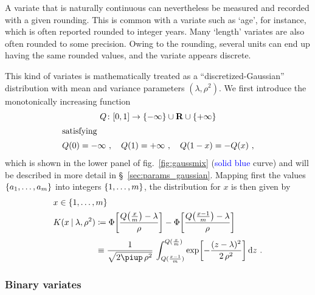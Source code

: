 \documentclass[a4paper,12pt,%
onecolumn,oneside,article,%
british%
]{memoir}
\newcommand*{\pu}{\piup}%
\newcommand*{\di}{\mathop{}\!\mathrm{d}}%
\newcommand*{\RR}{\bm{\mathrm{R}}}
\newcommand*{\defd}{\coloneqq}
\DeclarePairedDelimiter\clcl{[}{]}
\DeclarePairedDelimiter\set{\{}{\}} %
\renewcommand*{\|}[1][]{\nonscript\:#1\vert\nonscript\:\mathopen{}}
\newcommand*{\sect}{\S}%
\newcommand*{\fig}{fig.}%
\newcommand*{\mui}{\lambda}
\newcommand*{\sigmai}{\rho}
\begin{document}
A variate that is naturally continuous can nevertheless be measured and recorded with a given rounding. This is common with a variate such as \enquote*{age}, for instance, which is often reported rounded to integer years. Many \enquote*{length} variates are also often rounded to some precision. Owing to the rounding, several units can end up having the same rounded values, and the variate appears discrete.

This kind of variates is mathematically treated as a \enquote{discretized-Gaussian} distribution with mean and variance parameters $(\mui,\sigmai^{2})$. We first introduce the monotonically increasing function
\begin{gather}
    \label{eq:Q_function_integer}
    Q\colon \clcl{0,1} \to \set{-\infty}\cup\RR\cup\set{+\infty}
    \\ \shortintertext{satisfying}
    Q(0)=-\infty\ ,\quad Q(1)=+\infty \ ,
    \quad 
    Q(1-x)=-Q(x) \ ,
\end{gather}
which is shown in the lower panel of \fig~\ref{fig:gaussmix} (\textcolor{blue}{solid blue} curve) and will be described in more detail in \sect~\ref{sec:params_gaussian}. Mapping first the values $\set{a_{1}, \dotsc, a_{m}}$ into integers $\set{1, \dotsc, m}$, the distribution for $x$ is then given by
\begin{equation}
  \label{eq:K_int}
  \begin{split}
    &x \in \set{1, \dotsc, m}
    \\
    &\!\begin{aligned}
  K(x \| \mui, \sigmai^{2}) &\defd
  \Phi\biggl[
  \frac{Q\bigl(\frac{x}{m}\bigr) - \mui}{\sigmai}
  \biggr]
  -
  \Phi\biggl[
  \frac{Q\bigl(\frac{x-1}{m}\bigr) - \mui}{\sigmai}
  \biggr]
  \\[\jot]&\equiv
  \frac{1}{\sqrt{2\pu\,\sigmai^{2}}}\,
  \int_{Q(\frac{x-1}{m})}^{Q(\frac{x}{m})}
  \exp\biggl[-\frac{(z-\mui)^{2}}{2\,\sigmai^{2}}\biggr] \di z \ .
\end{aligned}
\end{split}
\end{equation}


\subsubsection{Binary variates}
\label{sec:variates_binary}
\end{document}
